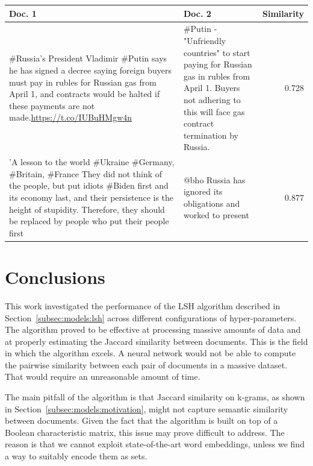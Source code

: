 \documentclass[runningheads]{llncs}
\begin{document}
\begin{table}
  \centering
  \begin{tabular}{p{}@{\hspace{0.5cm}}p{}@{\hspace{0.5cm}}r}
    \toprule
     Doc. 1 & Doc. 2 & Similarity \\
    \midrule
    \#Russia’s President Vladimir \#Putin says he has signed a decree saying foreign buyers must pay in rubles for Russian gas from April 1, and contracts would be halted if these payments are not made.\url{https://t.co/IUBuHMgw4n} & \#Putin - "Unfriendly countries"  to start paying for Russian gas in rubles from April 1. Buyers not adhering to this will face gas contract termination by Russia. & 0.728 \\
    \hline
    'A lesson to the world \#Ukraine \#Germany, \#Britain, \#France They did not think of the people, but put idiots \#Biden first and its economy last, and their persistence is the height of stupidity. Therefore, they should be replaced by people who put their people first & @bho Russia has ignored its obligations and worked to present & 0.877 \\
    \bottomrule
  \end{tabular}
\end{table}


\section{Conclusions}
\label{sec:conclusions}

This work investigated the performance of the LSH algorithm described in Section~\ref{subsec:models:lsh} across different configurations of hyper-parameters. The algorithm proved to be effective at processing massive amounts of data and at properly estimating the Jaccard similarity between documents. This is the field in which the algorithm excels. A neural network would not be able to compute the pairwise similarity between each pair of documents in a massive dataset. That would require an unreasonable amount of time.

The main pitfall of the algorithm is that Jaccard similarity on k-grams, as shown in Section~\ref{subsec:models:motivation}, might not capture semantic similarity between documents. Given the fact that the algorithm is built on top of a Boolean characteristic matrix, this issue may prove difficult to address. The reason is that we cannot exploit state-of-the-art word embeddings, unless we find a way to suitably encode them as sets.
\end{document}
